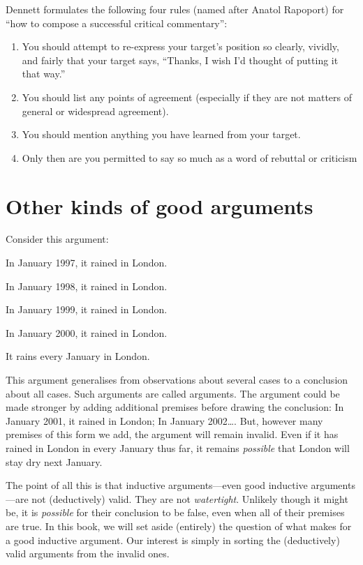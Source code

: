 Dennett formulates the following four rules (named after
Anatol Rapoport) for “how to compose a successful critical
commentary”:
\begin{enumerate}
\item You should attempt to re-express your target’s position so
clearly, vividly, and fairly that your target says, “Thanks, I
wish I’d thought of putting it that way.”
\item You should list any points of agreement (especially if they
are not matters of general or widespread agreement).
\item You should mention anything you have learned from your
target.
\item Only then are you permitted to say so much as a word of
rebuttal or criticism
\end{enumerate}


\section{Other kinds of good arguments}

Consider this argument:
	\begin{earg}
		\item[] In January 1997, it rained in London.
		\item[] In January 1998, it rained in London.
		\item[] In January 1999, it rained in London.
		\item[] In January 2000, it rained in London.
	\item[\therefore] It rains every January in London.
\end{earg}
This argument generalises from observations about several cases to a conclusion about all cases. Such arguments are called  arguments. The argument could be made stronger by adding additional premises before drawing the conclusion: In January 2001, it rained in London; In January 2002\ldots. But, however many premises of this form we add, the argument will remain invalid. Even if it has rained in London in every January thus far, it remains \emph{possible} that London will stay dry next January.

The point of all this is that inductive arguments---even good inductive arguments---are not (deductively) valid. They are not \emph{watertight}. Unlikely though it might be, it is \emph{possible} for their conclusion to be false, even when all of their premises are true. In this book, we will set aside (entirely) the question of what makes for a good inductive argument. Our interest is simply in sorting the (deductively) valid arguments from the invalid ones.  

